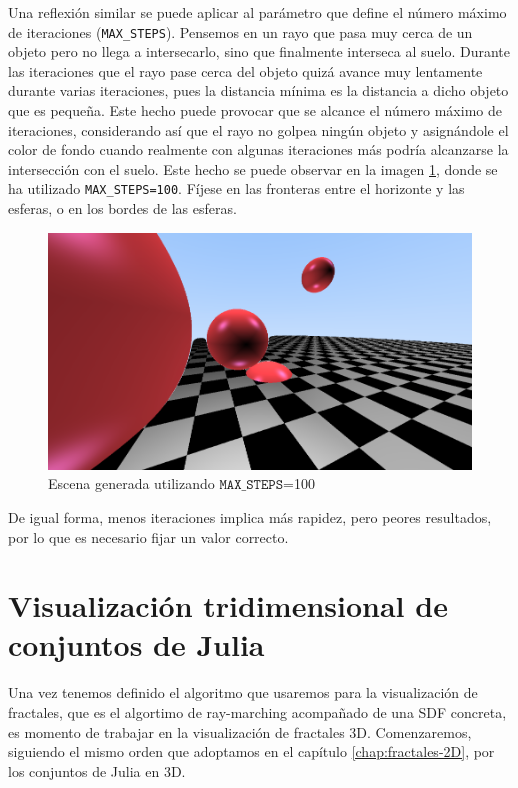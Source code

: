 Una reflexión similar se puede aplicar al parámetro que define el número máximo de iteraciones (\verb|MAX_STEPS|). Pensemos en un rayo que pasa muy cerca de un objeto pero no llega a intersecarlo, sino que finalmente interseca al suelo. Durante las iteraciones que el rayo pase cerca del objeto quizá avance muy lentamente durante varias iteraciones, pues la distancia mínima es la distancia a dicho objeto que es pequeña. Este hecho puede provocar que se alcance el número máximo de iteraciones, considerando así que el rayo no golpea ningún objeto y asignándole el color de fondo cuando realmente con algunas iteraciones más podría alcanzarse la intersección con el suelo. Este hecho se puede observar en la imagen \ref{fig:pocas-iteraciones}, donde se ha utilizado \verb|MAX_STEPS=100|. Fíjese en las fronteras entre el horizonte y las esferas, o en los bordes de las esferas.

\begin{figure} [ht]
    \centering
    \includegraphics[scale = 0.3]{img/C8/pocas-iteraciones.png}
    \caption{Escena generada utilizando $\mathtt{MAX\_STEPS}$=100}
    \label{fig:pocas-iteraciones}
\end{figure}

De igual forma, menos iteraciones implica más rapidez, pero peores resultados, por lo que es necesario fijar un valor correcto.

\section{Visualización tridimensional de conjuntos de Julia}

Una vez tenemos definido el algoritmo que usaremos para la visualización de fractales, que es el algortimo de ray-marching acompañado de una SDF concreta, es momento de trabajar en la visualización de fractales 3D. Comenzaremos, siguiendo el mismo orden que adoptamos en el capítulo \ref{chap:fractales-2D}, por los conjuntos de Julia en 3D.

